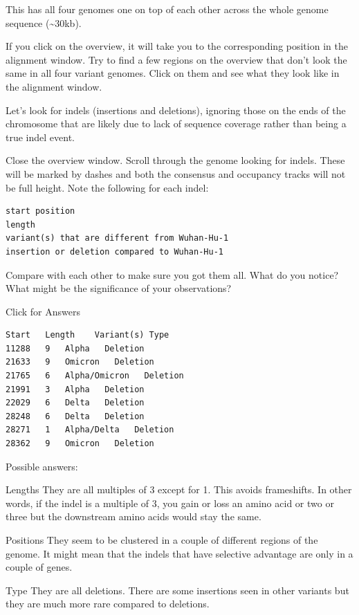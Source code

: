\documentclass[
]{book}
\begin{document}
This has all four genomes one on top of each other across the whole genome sequence (\textasciitilde30kb).

If you click on the overview, it will take you to the corresponding position in the alignment window. Try to find a few regions on the overview that don't look the same in all four variant genomes. Click on them and see what they look like in the alignment window.

Let's look for indels (insertions and deletions), ignoring those on the ends of the chromosome that are likely due to lack of sequence coverage rather than being a true indel event.

Close the overview window. Scroll through the genome looking for indels. These will be marked by dashes and both the consensus and occupancy tracks will not be full height. Note the following for each indel:

\begin{verbatim}
start position
length
variant(s) that are different from Wuhan-Hu-1
insertion or deletion compared to Wuhan-Hu-1
\end{verbatim}

Compare with each other to make sure you got them all. What do you notice? What might be the significance of your observations?

Click for Answers

\begin{verbatim}
Start   Length    Variant(s) Type
11288   9   Alpha   Deletion
21633   9   Omicron   Deletion
21765   6   Alpha/Omicron   Deletion
21991   3   Alpha   Deletion
22029   6   Delta   Deletion
28248   6   Delta   Deletion
28271   1   Alpha/Delta   Deletion
28362   9   Omicron   Deletion
\end{verbatim}

Possible answers:

Lengths
They are all multiples of 3 except for 1. This avoids frameshifts. In other words, if the indel is a multiple of 3, you gain or loss an amino acid or two or three but the downstream amino acids would stay the same.

Positions
They seem to be clustered in a couple of different regions of the genome. It might mean that the indels that have selective advantage are only in a couple of genes.

Type
They are all deletions. There are some insertions seen in other variants but they are much more rare compared to deletions.

\hfill\break
\end{document}
